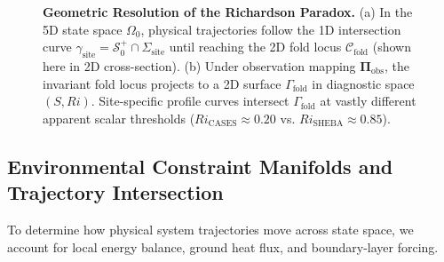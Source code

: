 \begin{figure}[t]
\caption{\textbf{Geometric Resolution of the Richardson Paradox.} (a) In the 5D state space $\Omega_0$, physical trajectories follow the 1D intersection curve $\gamma_{\mathrm{site}} = \mathcal{S}_0^+ \cap \Sigma_{\mathrm{site}}$ until reaching the 2D fold locus $\mathcal{C}_{\mathrm{fold}}$ (shown here in 2D cross-section). (b) Under observation mapping $\boldsymbol{\Pi}_{\mathrm{obs}}$, the invariant fold locus projects to a 2D surface $\Gamma_{\mathrm{fold}}$ in diagnostic space $(S, Ri)$. Site-specific profile curves intersect $\Gamma_{\mathrm{fold}}$ at vastly different apparent scalar thresholds ($Ri_{\mathrm{CASES}} \approx 0.20$ vs. $Ri_{\mathrm{SHEBA}} \approx 0.85$).}
\label{fig:projection_paradox}
\end{figure}

\subsection{Environmental Constraint Manifolds and Trajectory Intersection}

To determine how physical system trajectories move across state space, we account for local energy balance, ground heat flux, and boundary-layer forcing.

